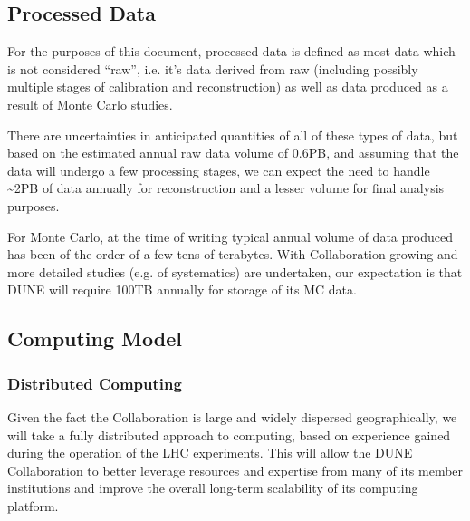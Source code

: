 \subsection{Processed Data}
\label{sec:detectors-sc-infrastructure-processed-data}
For the purposes of this document, processed data is defined as most data which is not considered ``raw'', i.e. it's data derived from raw (including possibly multiple stages
of calibration and reconstruction) as well as data produced as a result of Monte Carlo studies.

There are uncertainties in anticipated quantities of all of these types of data, but based on the estimated annual raw data volume of 0.6PB, and assuming that
the data will undergo a few processing stages, we can expect the need to handle \textasciitilde 2PB of data annually for reconstruction and a lesser
volume for final analysis purposes.

For Monte Carlo, at the time of writing typical annual volume of data produced has been of the order of a few tens of terabytes. With Collaboration growing
and more detailed studies (e.g. of systematics) are undertaken, our expectation is that DUNE will require 100TB annually for storage of its MC data.

\subsection{Computing Model}
\label{sec:detectors-sc-infrastructure-computing-model}

\subsubsection{Distributed Computing}


Given the fact the Collaboration is large and widely dispersed geographically, we will take a fully distributed approach to computing, based on experience
gained during the operation of the LHC experiments. This will allow the DUNE Collaboration to better leverage resources and expertise from many of its
member institutions and improve the overall long-term scalability of its computing platform.

